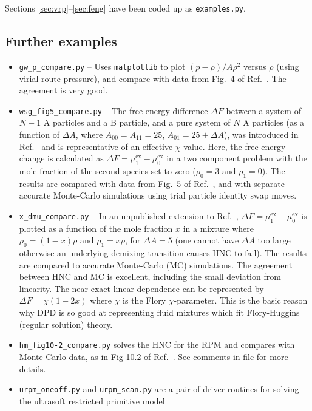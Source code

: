 \documentclass[12pt,a4paper]{article}
\newcommand{\myex}{^{\mathrm{ex}}}
\newcommand{\muex}{\mu\myex}
\newcommand{\Refcite}[1]{Ref.~\cite{#1}}
\begin{document}
Sections \ref{sec:vrp}--\ref{sec:feng} have been coded up as
\verb+examples.py+. 

\subsection{Further examples}

\begin{itemize}
%
\item\verb+gw_p_compare.py+ -- Uses \verb+matplotlib+ to plot
  $(p-\rho) /A\rho^2$ versus $\rho$ (using virial route pressure), and
  compare with data from Fig.~4 of \Refcite{GW97}.  The agreement is
  very good.
%
\item\verb+wsg_fig5_compare.py+ -- The free energy difference $\Delta
  F$ between a system of $N-1$ A particles and a B particle, and a
  pure system of $N$ A particles (as a function of $\Delta A$, where
  $A_{00}=A_{11}=25$, $A_{01}=25+\Delta A$), was introduced in
  \Refcite{WSG01} and is representative of an effective $\chi$ value.
  Here, the free energy change is calculated as $\Delta
  F=\muex_1-\muex_0$ in a two component problem with the mole fraction
  of the second species set to zero ($\rho_0=3$ and $\rho_1=0$).  The
  results are compared with data from Fig.~5 of \Refcite{WSG01}, and
  with separate accurate Monte-Carlo simulations using trial particle
  identity swap moves. 
%
\item\verb+x_dmu_compare.py+ -- In an unpublished extension to
  \Refcite{WSG01}, $\Delta F=\muex_1-\muex_0$ is plotted as a function
  of the mole fraction $x$ in a mixture where $\rho_0=(1-x)\rho$ and
  $\rho_1=x\rho$, for $\Delta A=5$ (one cannot have $\Delta A$ too
  large otherwise an underlying demixing transition causes HNC to
  fail).  The results are compared to accurate Monte-Carlo (MC)
  simulations.  The agreement between HNC and MC is excellent,
  including the small deviation from linearity.  The near-exact linear
  dependence can be represented by $\Delta F = \chi (1 - 2x)$ where
  $\chi$ is the Flory $\chi$-parameter.  This is the basic reason why
  DPD is so good at representing fluid mixtures which fit
  Flory-Huggins (regular solution) theory.
%
\item\verb+hm_fig10-2_compare.py+ solves the HNC for the RPM and
  compares with Monte-Carlo data, as in Fig 10.2 of \Refcite{HM06}.
  See comments in file for more details.
%
\item\verb+urpm_oneoff.py+ and \verb+urpm_scan.py+ are a pair of
  driver routines for solving the ultrasoft restricted primitive model

\end{itemize}
\end{document}
